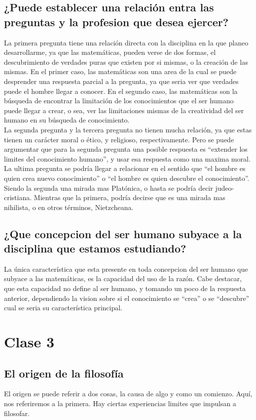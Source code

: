     \section{¿Puede establecer una relación entra las preguntas y la profesion que desea ejercer?}
    La primera pregunta tiene una relación directa con la disciplina en la que planeo desarrollarme, ya que las matemáticas, pueden verse de dos formas, el descubrimiento de verdades puras que existen por si mismas, o la creación de las mismas. En el primer caso, las matemáticas son una area de la cual se puede desprender una respuesta parcial a la pregunta, ya que seria ver que verdades puede el hombre llegar a conocer. En el segundo caso, las matemáticas son la búsqueda de encontrar la limitación de los conocimientos que el ser humano puede llegar a crear, o sea, ver las limitaciones mismas de la creatividad del ser humano en su búsqueda de conocimiento.\\
    La segunda pregunta y la tercera pregunta no tienen mucha relación, ya que estas tienen un carácter moral o ético, y religioso, respectivamente. Pero se puede argumentar que para la segunda pregunta una posible respuesta es ``extender los limites del conocimiento humano'', y usar esa respuesta como una maxima moral.\\
    La ultima pregunta se podría llegar a relacionar en el sentido que ``el hombre es quien crea nuevo conocimiento'' o ``el hombre es quien descubre el conocimiento''. Siendo la segunda una mirada mas Platónica, o hasta se podría decir judeo-cristiana. Mientras que la primera, podría decirse que es una mirada mas nihilista, o en otros términos, Nietzcheana.

    \section{¿Que concepcion del ser humano subyace a la disciplina que estamos estudiando?}
    La única característica que esta presente en toda concepcion del ser humano que subyace a las matemáticas, es la capacidad del uso de la razón. Cabe destacar, que esta capacidad no define al ser humano, y tomando un poco de la respuesta anterior, dependiendo la vision sobre si el conocimiento se ``crea'' o se ``descubre'' cual se seria su característica principal.

    \chapter{Clase 3}
    \section{El origen de la filosofía}
    El origen se puede referir a dos cosas, la causa de algo y como un comienzo. Aquí, nos referiremos a la primera. Hay ciertas experiencias limites que impulsan a filosofar.
